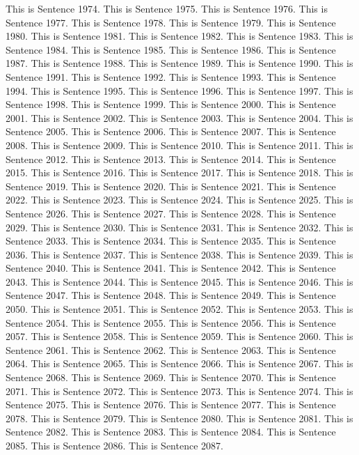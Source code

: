 \documentclass{article}
\begin{document}
This is Sentence 1974.
This is Sentence 1975.
This is Sentence 1976.
This is Sentence 1977.
This is Sentence 1978.
This is Sentence 1979.
This is Sentence 1980.
This is Sentence 1981.
This is Sentence 1982.
This is Sentence 1983.
This is Sentence 1984.
This is Sentence 1985.
This is Sentence 1986.
This is Sentence 1987.
This is Sentence 1988.
This is Sentence 1989.
This is Sentence 1990.
This is Sentence 1991.
This is Sentence 1992.
This is Sentence 1993.
This is Sentence 1994.
This is Sentence 1995.
This is Sentence 1996.
This is Sentence 1997.
This is Sentence 1998.
This is Sentence 1999.
This is Sentence 2000.
This is Sentence 2001.
This is Sentence 2002.
This is Sentence 2003.
This is Sentence 2004.
This is Sentence 2005.
This is Sentence 2006.
This is Sentence 2007.
This is Sentence 2008.
This is Sentence 2009.
This is Sentence 2010.
This is Sentence 2011.
This is Sentence 2012.
This is Sentence 2013.
This is Sentence 2014.
This is Sentence 2015.
This is Sentence 2016.
This is Sentence 2017.
This is Sentence 2018.
This is Sentence 2019.
This is Sentence 2020.
This is Sentence 2021.
This is Sentence 2022.
This is Sentence 2023.
This is Sentence 2024.
This is Sentence 2025.
This is Sentence 2026.
This is Sentence 2027.
This is Sentence 2028.
This is Sentence 2029.
This is Sentence 2030.
This is Sentence 2031.
This is Sentence 2032.
This is Sentence 2033.
This is Sentence 2034.
This is Sentence 2035.
This is Sentence 2036.
This is Sentence 2037.
This is Sentence 2038.
This is Sentence 2039.
This is Sentence 2040.
This is Sentence 2041.
This is Sentence 2042.
This is Sentence 2043.
This is Sentence 2044.
This is Sentence 2045.
This is Sentence 2046.
This is Sentence 2047.
This is Sentence 2048.
This is Sentence 2049.
This is Sentence 2050.
This is Sentence 2051.
This is Sentence 2052.
This is Sentence 2053.
This is Sentence 2054.
This is Sentence 2055.
This is Sentence 2056.
This is Sentence 2057.
This is Sentence 2058.
This is Sentence 2059.
This is Sentence 2060.
This is Sentence 2061.
This is Sentence 2062.
This is Sentence 2063.
This is Sentence 2064.
This is Sentence 2065.
This is Sentence 2066.
This is Sentence 2067.
This is Sentence 2068.
This is Sentence 2069.
This is Sentence 2070.
This is Sentence 2071.
This is Sentence 2072.
This is Sentence 2073.
This is Sentence 2074.
This is Sentence 2075.
This is Sentence 2076.
This is Sentence 2077.
This is Sentence 2078.
This is Sentence 2079.
This is Sentence 2080.
This is Sentence 2081.
This is Sentence 2082.
This is Sentence 2083.
This is Sentence 2084.
This is Sentence 2085.
This is Sentence 2086.
This is Sentence 2087.
\end{document}
